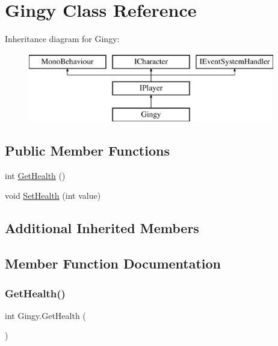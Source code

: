 \hypertarget{class_gingy}{}\section{Gingy Class Reference}
\label{class_gingy}
Inheritance diagram for Gingy\+:\begin{figure}[H]
\begin{center}
\leavevmode
\includegraphics[height=3.000000cm]{class_gingy}
\end{center}
\end{figure}
\subsection*{Public Member Functions}
\begin{DoxyCompactItemize}
\item 
int \mbox{\hyperlink{class_gingy_ae36218bf9d6ae39c9176da509d67f007}{Get\+Health}} ()
\item 
void \mbox{\hyperlink{class_gingy_a47954df8d4b796088a54e147be4b789d}{Set\+Health}} (int value)
\end{DoxyCompactItemize}
\subsection*{Additional Inherited Members}


\subsection{Member Function Documentation}
\mbox{\label{class_gingy_ae36218bf9d6ae39c9176da509d67f007}} 
\subsubsection{\texorpdfstring{Get\+Health()}{GetHealth()}}
{\footnotesize\ttfamily int Gingy.\+Get\+Health (\begin{DoxyParamCaption}{ }\end{DoxyParamCaption})\hspace{0.3cm}{\ttfamily [inline]}}

